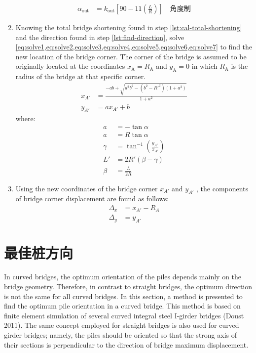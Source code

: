 \begin{enumerate}
\begin{align}
    \alpha_\text{out} &= k_\text{out} \left[ 90- 11 \left(\frac{L}{R}\right)\right] \quad \text{角度制}
  \end{align}
  \item Knowing the total bridge shortening found in step \ref{lst:cal-total-shortening} and the direction found in step \ref{lst:find-direction}, solve \cref{eq:solve1,eq:solve2,eq:solve3,eq:solve4,eq:solve5,eq:solve6,eq:solve7} to find the new location of the bridge corner. The corner of the bridge is assumed to be originally located at the coordinates $x_\text{A} = R_\text{A}$ and $y_\text{A} = 0$ in which $R_\text{A}$ is the radius of the bridge at  that specific corner.
  \begin{align}
    \label{eq:solve1} x_{A'}&=\frac{-ab+\sqrt{a^2b^2-(b^2-R'^2)(1+a^2)}}{1+a^2}\\
    \label{eq:solve2} y_{A'}&=a x_{A'} + b
  \end{align}
  where:
  \begin{align}
    \label{eq:solve3}  a &= -\tan \alpha \\
    \label{eq:solve4}  a &= R \tan \alpha \\
    \label{eq:solve5}  \gamma &= \tan^{-1}\left(\frac{y_{A'}}{x_{A'}}\right)\\
    \label{eq:solve6}  L'     &= 2R'(\beta-\gamma)\\
    \label{eq:solve7}  \beta  &= \frac{L}{2R}
  \end{align}
  \item Using the new coordinates of the bridge corner $x_{A'}$ and $y_{A'}$ , the components of bridge corner displacement are found as follows:
  \begin{align}
    \Delta_{x} &= x_{A'} -R_{A}\\    
    \Delta_{y} &=  y_{A'}   
  \end{align}
\end{enumerate}

\section{最佳桩方向}
In curved bridges, the optimum orientation of the piles depends mainly on the bridge geometry. Therefore, in contrast to straight bridges, the optimum direction is not the same for all curved bridges. In this section, a method is presented to find the optimum pile orientation in a curved bridge. This method is based on finite element simulation of several curved integral steel I-girder bridges (Doust 2011). The same concept employed for straight bridges is also used for curved girder bridges; namely, the piles should be oriented so that the strong axis of their sections is perpendicular to the direction of bridge maximum displacement.

